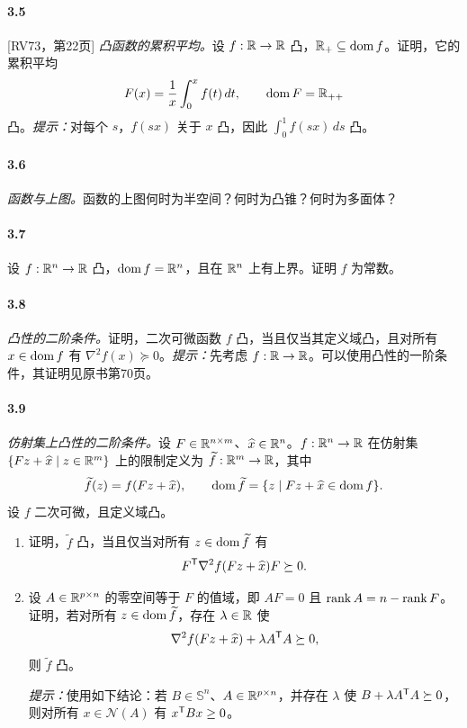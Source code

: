 \paragraph{3.5}[RV73，第22页] \textit{凸函数的累积平均。}设 $f:\mathbb R\to\mathbb R$ 凸，$\mathbb R_+\subseteq\operatorname{dom} f$。证明，它的累积平均
\[F(x)=\frac1x\int_0^x f(t)\,dt,\qquad\operatorname{dom} F=\mathbb R_{++}\]
凸。\textit{提示：}对每个 $s$，$f(sx)$ 关于 $x$ 凸，因此 $\int_0^1 f(sx)\,ds$ 凸。
\paragraph{3.6}\textit{函数与上图。}函数的上图何时为半空间？何时为凸锥？何时为多面体？
\paragraph{3.7}设 $f:\mathbb R^n\to\mathbb R$ 凸，$\operatorname{dom} f=\mathbb R^n$，且在 $\mathbb R^n$ 上有上界。证明 $f$ 为常数。
\paragraph{3.8}\textit{凸性的二阶条件。}证明，二次可微函数 $f$ 凸，当且仅当其定义域凸，且对所有 $x\in\operatorname{dom} f$ 有 $\nabla^2f(x)\succeq0$。\textit{提示：}先考虑 $f:\mathbb R\to\mathbb R$。可以使用凸性的一阶条件，其证明见原书第70页。
\paragraph{3.9}\textit{仿射集上凸性的二阶条件。}设 $F\in\mathbb R^{n\times m}$、$\widehat x\in\mathbb R^n$。$f:\mathbb R^n\to\mathbb R$ 在仿射集 $\{Fz+\widehat x\mid z\in\mathbb R^m\}$ 上的限制定义为 $\widetilde f:\mathbb R^m\to\mathbb R$，其中
\[\widetilde f(z)=f(Fz+\widehat x),\qquad\operatorname{dom}\widetilde f=\{z\mid Fz+\widehat x\in\operatorname{dom} f\}.\]
设 $f$ 二次可微，且定义域凸。
\begin{enumerate}[label=(\alph*)]
\item 证明，$\widetilde f$ 凸，当且仅当对所有 $z\in\operatorname{dom}\widetilde f$ 有
\[F^\mathsf T\nabla^2f(Fz+\widehat x)F\succeq0.\]
\item 设 $A\in\mathbb R^{p\times n}$ 的零空间等于 $F$ 的值域，即 $AF=0$ 且 $\operatorname{rank} A=n-\operatorname{rank} F$。证明，若对所有 $z\in\operatorname{dom}\widetilde f$，存在 $\lambda\in\mathbb R$ 使
\[\nabla^2f(Fz+\widehat x)+\lambda A^\mathsf T A\succeq0,\]
则 $\widetilde f$ 凸。

\textit{提示：}使用如下结论：若 $B\in\mathbb S^n$、$A\in\mathbb R^{p\times n}$，并存在 $\lambda$ 使 $B+\lambda A^\mathsf T A\succeq0$，则对所有 $x\in\mathcal N(A)$ 有 $x^\mathsf T Bx\geq0$。
\end{enumerate}
